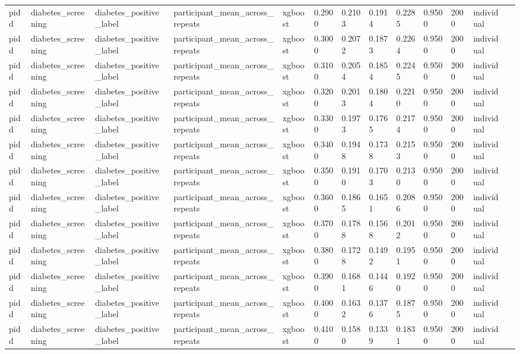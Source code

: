\begin{tabular}{lllllllllllll}
pidd & diabetes\_screening & diabetes\_positive\_label & participant\_mean\_across\_repeats & xgboost & 0.2900 & 0.2103 & 0.1914 & 0.2285 & 0.9500 & 2000 & individual &  \\
pidd & diabetes\_screening & diabetes\_positive\_label & participant\_mean\_across\_repeats & xgboost & 0.3000 & 0.2072 & 0.1873 & 0.2264 & 0.9500 & 2000 & individual &  \\
pidd & diabetes\_screening & diabetes\_positive\_label & participant\_mean\_across\_repeats & xgboost & 0.3100 & 0.2054 & 0.1854 & 0.2245 & 0.9500 & 2000 & individual &  \\
pidd & diabetes\_screening & diabetes\_positive\_label & participant\_mean\_across\_repeats & xgboost & 0.3200 & 0.2013 & 0.1804 & 0.2210 & 0.9500 & 2000 & individual &  \\
pidd & diabetes\_screening & diabetes\_positive\_label & participant\_mean\_across\_repeats & xgboost & 0.3300 & 0.1973 & 0.1765 & 0.2174 & 0.9500 & 2000 & individual &  \\
pidd & diabetes\_screening & diabetes\_positive\_label & participant\_mean\_across\_repeats & xgboost & 0.3400 & 0.1948 & 0.1738 & 0.2153 & 0.9500 & 2000 & individual &  \\
pidd & diabetes\_screening & diabetes\_positive\_label & participant\_mean\_across\_repeats & xgboost & 0.3500 & 0.1910 & 0.1703 & 0.2130 & 0.9500 & 2000 & individual &  \\
pidd & diabetes\_screening & diabetes\_positive\_label & participant\_mean\_across\_repeats & xgboost & 0.3600 & 0.1865 & 0.1651 & 0.2086 & 0.9500 & 2000 & individual &  \\
pidd & diabetes\_screening & diabetes\_positive\_label & participant\_mean\_across\_repeats & xgboost & 0.3700 & 0.1788 & 0.1568 & 0.2012 & 0.9500 & 2000 & individual &  \\
pidd & diabetes\_screening & diabetes\_positive\_label & participant\_mean\_across\_repeats & xgboost & 0.3800 & 0.1728 & 0.1492 & 0.1951 & 0.9500 & 2000 & individual &  \\
pidd & diabetes\_screening & diabetes\_positive\_label & participant\_mean\_across\_repeats & xgboost & 0.3900 & 0.1681 & 0.1446 & 0.1920 & 0.9500 & 2000 & individual &  \\
pidd & diabetes\_screening & diabetes\_positive\_label & participant\_mean\_across\_repeats & xgboost & 0.4000 & 0.1632 & 0.1376 & 0.1875 & 0.9500 & 2000 & individual &  \\
pidd & diabetes\_screening & diabetes\_positive\_label & participant\_mean\_across\_repeats & xgboost & 0.4100 & 0.1580 & 0.1339 & 0.1831 & 0.9500 & 2000 & individual &  \\

\end{tabular}
